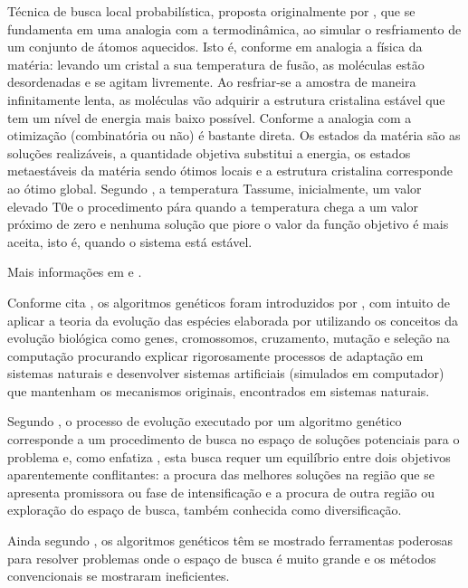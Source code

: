Técnica de busca local probabilística, proposta originalmente por \cite{kirkpatrick1983optimization}, que se fundamenta em uma analogia com a termodinâmica, ao simular o 
resfriamento de um conjunto de átomos aquecidos. Isto é, conforme \cite{noronha2003abordagem} em 
analogia a física da matéria: levando um cristal a sua temperatura de fusão, as moléculas 
estão desordenadas e se agitam livremente. Ao resfriar-se a amostra de maneira 
infinitamente lenta, as moléculas vão adquirir a estrutura cristalina estável que tem um 
nível de energia mais baixo possível. 
Conforme \cite{aarts1988simulated} a analogia com a otimização (combinatória ou não) 
é bastante direta. Os estados da matéria são as soluções realizáveis, a quantidade objetiva 
substitui a energia, os estados metaestáveis da matéria sendo ótimos locais e a estrutura 
cristalina corresponde ao ótimo global. 
Segundo \cite{reeves1993modern}, a temperatura Tassume, inicialmente, um valor 
elevado T0e o procedimento pára quando a temperatura chega a um valor próximo de zero 
e nenhuma solução que piore o valor da função objetivo é mais aceita, isto é, quando o 
sistema está estável.\par
Mais informações em \cite{reeves1993modern} e \cite{kirkpatrick1983optimization}. 


Conforme cita \cite{oliveira2005algoritmo}, os algoritmos genéticos foram introduzidos 
por \cite{holland1975adaptation}, com intuito de aplicar a teoria da evolução das espécies 
elaborada por \cite{darwin1968origin} utilizando os conceitos da evolução biológica como 
genes, cromossomos, cruzamento, mutação e seleção na computação procurando explicar rigorosamente processos de adaptação em sistemas naturais e desenvolver sistemas artificiais (simulados em computador) que mantenham os mecanismos originais, encontrados em sistemas naturais.\par

Segundo \cite{oliveira2005algoritmo}, o processo de evolução executado por um algoritmo genético corresponde a um procedimento de busca no espaço de soluções potenciais para o problema e, como enfatiza \cite{michalewicz1996evolutionary}, esta busca requer um equilíbrio entre dois objetivos aparentemente conflitantes: a procura das melhores soluções na região que se apresenta promissora ou fase de intensificação e a procura de outra região ou exploração do espaço de busca, também conhecida como diversificação.\par
Ainda segundo \cite{oliveira2005algoritmo}, os algoritmos genéticos têm se mostrado ferramentas poderosas para resolver problemas onde o espaço de busca é muito grande e os métodos convencionais se mostraram ineficientes.\par

